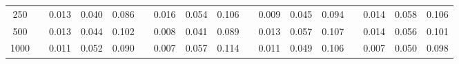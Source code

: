 % 
\begin{tabular}{ccccccccccccccccc}
  \hline
  \hline
250 &  & 0.013 & 0.040 & 0.086 &  & 0.016 & 0.054 & 0.106 &  & 0.009 & 0.045 & 0.094 &  & 0.014 & 0.058 & 0.106 \\ 
  500 &  & 0.013 & 0.044 & 0.102 &  & 0.008 & 0.041 & 0.089 &  & 0.013 & 0.057 & 0.107 &  & 0.014 & 0.056 & 0.101 \\ 
  1000 &  & 0.011 & 0.052 & 0.090 &  & 0.007 & 0.057 & 0.114 &  & 0.011 & 0.049 & 0.106 &  & 0.007 & 0.050 & 0.098 \\ 
   \hline
\end{tabular}
